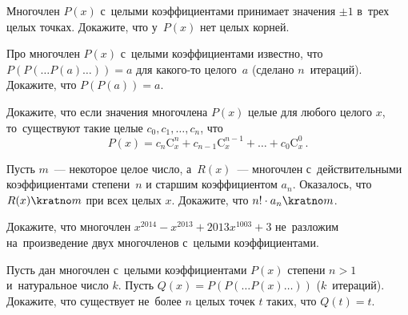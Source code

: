 


\begingroup
    \def\binom#1#2{\mathrm{C}_{#1}^{#2}}%

\begin{problems}

\item
Многочлен $P(x)$ с~целыми коэффициентами принимает значения $\pm 1$ в~трех
целых точках.
Докажите, что у~$P(x)$ нет целых корней.

\item
Про многочлен $P(x)$ с~целыми коэффициентами известно, что
\( P(P( \ldots P(a) \ldots )) = a \) для какого-то целого~$a$
(сделано $n$~итераций).
Докажите, что $P(P(a)) = a$.

\item
Докажите, что если значения многочлена $P(x)$ целые для любого целого $x$,
то~существуют такие целые $c_{0}, c_{1}, \ldots, c_{n}$, что
\[
    P(x)
=
    c_{n} \binom{x}{n} + c_{n-1} \binom{x}{n-1} + \ldots + c_{0} \binom{x}{0}
\, . \]

\item
Пусть $m$~--- некоторое целое число, а~$R(x)$~--- многочлен с~действительными
коэффициентами степени~$n$ и старшим коэффициентом $a_{n}$.
Оказалось, что $R(x) \kratno m$ при всех целых $x$.
Докажите, что ${n!} \cdot a_{n} \kratno m$.

\item
Докажите, что многочлен $x^{2014} - x^{2013} + 2013 x^{1003} + 3$ не~разложим
на~произведение двух многочленов с~целыми коэффициентами.

\item
Пусть дан многочлен с~целыми коэффициентами $P(x)$ степени $n > 1$
и~натуральное число $k$.
Пусть $Q(x) = P(P( \ldots P(x) \ldots ))$ ($k$~итераций).
Докажите, что существует не~более $n$ целых точек $t$ таких, что $Q(t) = t$.

\end{problems}

\endgroup %


